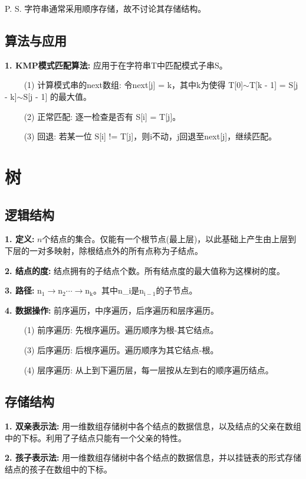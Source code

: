P. S. 字符串通常采用顺序存储，故不讨论其存储结构。

\subsection{算法与应用}

\textbf{1. KMP模式匹配算法: }应用于在字符串T中匹配模式子串S。

~~~~ (1) 计算模式串的next数组: 令next[j] = k，其中k为使得 T[0]$\sim$T[k - 1] = S[j - k]$\sim$S[j - 1] 的最大值。

~~~~ (2) 正常匹配: 逐一检查是否有 S[i] = T[j]。

~~~~ (3) 回退: 若某一位 S[i] != T[j]，则i不动，j回退至next[j]，继续匹配。

\section{树}

\subsection{逻辑结构}

\textbf{1. 定义: }$n$个结点的集合。仅能有一个根节点(最上层)，以此基础上产生由上层到下层的一对多映射，除根结点外的所有点称为子结点。

\textbf{2. 结点的度: }结点拥有的子结点个数。所有结点度的最大值称为这棵树的度。

\textbf{3. 路径: }n$_1\rightarrow$n$_2\cdots \rightarrow$n$_\text{k}$。其中n\_i是n$_{\text{i}-1}$的子节点。

\textbf{4. 数据操作: }前序遍历，中序遍历，后序遍历和层序遍历。

~~~~ (1) 前序遍历: 先根序遍历。遍历顺序为根-其它结点。

~~~~ (3) 后序遍历: 后根序遍历。遍历顺序为其它结点-根。

~~~~ (4) 层序遍历: 从上到下遍历层，每一层按从左到右的顺序遍历结点。

\subsection{存储结构}

\textbf{1. 双亲表示法: }用一维数组存储树中各个结点的数据信息，以及结点的父亲在数组中的下标。利用了子结点只能有一个父亲的特性。

\textbf{2. 孩子表示法: }用一维数组存储树中各个结点的数据信息，并以挂链表的形式存储结点的孩子在数组中的下标。

